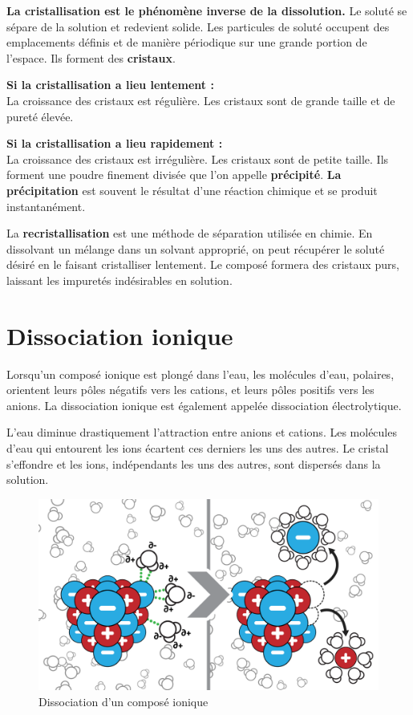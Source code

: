 \documentclass[
  11pt,
  a4paper,
  openany]{book}
\begin{document}
\textbf{La cristallisation est le phénomène inverse de la dissolution.} Le soluté se sépare de la solution et redevient solide. Les particules de soluté occupent des emplacements définis et de manière périodique sur une grande portion de l'espace. Ils forment des \textbf{cristaux}.

\textbf{Si la cristallisation a lieu lentement :}\\
La croissance des cristaux est régulière. Les cristaux sont de grande taille et de pureté élevée.

\textbf{Si la cristallisation a lieu rapidement :}\\
La croissance des cristaux est irrégulière. Les cristaux sont de petite taille. Ils forment une poudre finement divisée que l'on appelle \textbf{précipité}. \textbf{La précipitation} est souvent le résultat d'une réaction chimique et se produit instantanément.

La \textbf{recristallisation} est une méthode de séparation utilisée en chimie. En dissolvant un mélange dans un solvant approprié, on peut récupérer le soluté désiré en le faisant cristalliser lentement. Le composé formera des cristaux purs, laissant les impuretés indésirables en solution.

\hypertarget{dissociation-ionique}{%
\section{Dissociation ionique}\label{dissociation-ionique}}

Lorsqu'un composé ionique est plongé dans l'eau, les molécules d'eau, polaires, orientent leurs pôles négatifs vers les cations, et leurs pôles positifs vers les anions. La dissociation ionique est également appelée dissociation électrolytique.

L'eau diminue drastiquement l'attraction entre anions et cations. Les molécules d'eau qui entourent les ions écartent ces derniers les uns des autres. Le cristal s'effondre et les ions, indépendants les uns des autres, sont dispersés dans la solution.

\begin{figure}

{\centering \includegraphics[width=0.5\linewidth]{images/dissociation} 

}

\caption{Dissociation d'un composé ionique}\label{fig:dissociation}
\end{figure}
\end{document}
